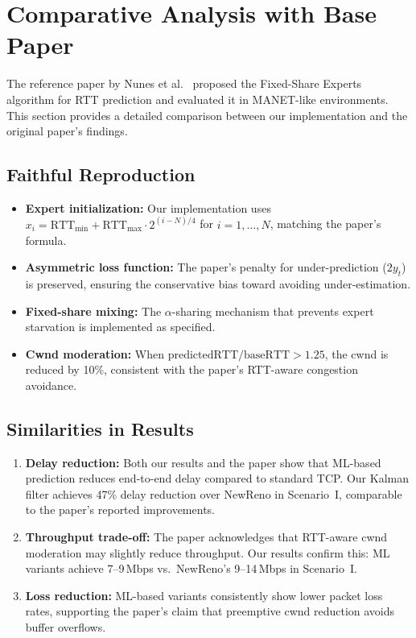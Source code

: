 \documentclass[12pt,a4paper]{article}
\begin{document}
\section{Comparative Analysis with Base Paper}
\label{sec:comparison}

The reference paper by Nunes et al.~\cite{nunes2011} proposed the Fixed-Share Experts algorithm for RTT prediction and evaluated it in MANET-like environments. This section provides a detailed comparison between our implementation and the original paper's findings.

\subsection{Faithful Reproduction}

\begin{itemize}
    \item \textbf{Expert initialization:} Our implementation uses $x_i = \text{RTT}_{\min} + \text{RTT}_{\max} \cdot 2^{(i-N)/4}$ for $i = 1, \ldots, N$, matching the paper's formula.
    \item \textbf{Asymmetric loss function:} The paper's penalty for under-prediction ($2y_t$) is preserved, ensuring the conservative bias toward avoiding under-estimation.
    \item \textbf{Fixed-share mixing:} The $\alpha$-sharing mechanism that prevents expert starvation is implemented as specified.
    \item \textbf{Cwnd moderation:} When $\text{predictedRTT}/\text{baseRTT} > 1.25$, the cwnd is reduced by 10\%, consistent with the paper's RTT-aware congestion avoidance.
\end{itemize}

\subsection{Similarities in Results}

\begin{enumerate}
    \item \textbf{Delay reduction:} Both our results and the paper show that ML-based prediction reduces end-to-end delay compared to standard TCP. Our Kalman filter achieves 47\% delay reduction over NewReno in Scenario~I, comparable to the paper's reported improvements.
    \item \textbf{Throughput trade-off:} The paper acknowledges that RTT-aware cwnd moderation may slightly reduce throughput. Our results confirm this: ML variants achieve 7--9\,Mbps vs.~NewReno's 9--14\,Mbps in Scenario~I.
    \item \textbf{Loss reduction:} ML-based variants consistently show lower packet loss rates, supporting the paper's claim that preemptive cwnd reduction avoids buffer overflows.
\end{enumerate}
\end{document}
